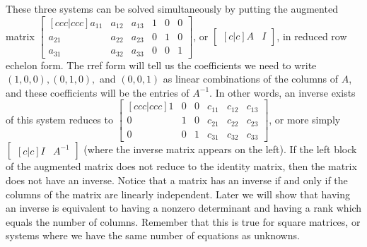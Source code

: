 \documentclass[10pt]{article}
\begin{document}
These three systems can be solved simultaneously by putting the augmented matrix {$\begin{bmatrix}[ccc|ccc]
a_{11}&a_{12}&a_{13}&1&0&0\\ 
a_{21}&a_{22}&a_{23}&0&1&0\\ 
a_{31}&a_{32}&a_{33}&0&0&1 
\end{bmatrix} $}, or $\begin{bmatrix}[c|c]A &I\end{bmatrix}$, in reduced row echelon form. The rref form will tell us the coefficients we need to write $(1,0,0), (0,1,0),$ and  $(0,0,1)$ as linear combinations of the columns of $A$, and these coefficients will be the entries of $A^{-1}$.  In other words, an inverse exists of this system reduces to $\begin{bmatrix}[ccc|ccc]
1&0&0&c_{11}&c_{12}&c_{13}\\ 
0&1&0&c_{21}&c_{22}&c_{23}\\ 
0&0&1&c_{31}&c_{32}&c_{33} 
\end{bmatrix} $, or more simply $\begin{bmatrix}[c|c]I& A^{-1}\end{bmatrix}$ (where the inverse matrix appears on the left).  If the left block of the augmented matrix does not reduce to the identity matrix, then the matrix does not have an inverse.  Notice that a matrix has an inverse if and only if the columns of the matrix are linearly independent. Later we will show that having an inverse is equivalent to having a nonzero determinant and having a rank which equals the number of columns. Remember that this is true for square matrices, or systems where we have the same number of equations as unknowns.
\end{document}

